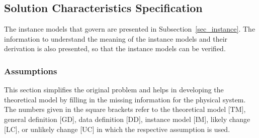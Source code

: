\documentclass[12pt]{article}
\begin{document}
\newpage

\subsection{Solution Characteristics Specification}


The instance models that govern \progname{} are presented in
Subsection~\ref{sec_instance}.  The information to understand the meaning of the
instance models and their derivation is also presented, so that the instance
models can be verified.

\subsubsection{Assumptions} \label{sec_assumps}

This section simplifies the original problem and helps in developing the
theoretical model by filling in the missing information for the physical
system. The numbers given in the square brackets refer to the theoretical model
  [TM], general definition [GD], data definition [DD], instance model [IM],
likely change [LC], or unlikely change [UC] in which the respective assumption
is used.
\end{document}
